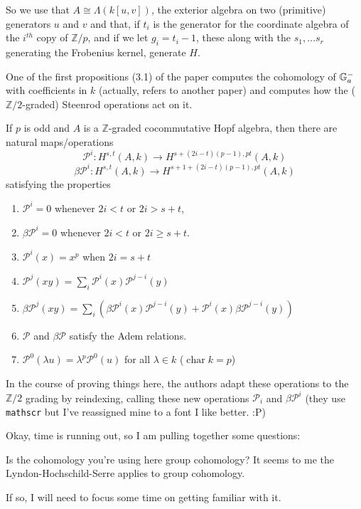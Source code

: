 \documentclass[12pt]{article}
\theoremstyle{nonumberbreak}
\theoremstyle{changebreak}
\theoremstyle{nonumberplain}
\theoremstyle{change}
\newcommand*{\bbZ}{\mathbb{Z}}
\newcommand*{\bbG}{\ensuremath\mathbb{G}}
\DeclareMathOperator{\ch}{char}
\begin{document}
So we use that $A\cong \Lambda(k[u,v])$, the exterior algebra on two (primitive) generators $u$ and $v$
and that, if $t_i$ is the generator for the coordinate algebra of the $i^{th}$ copy of $\bbZ/p$, and if 
we let $g_i=t_i-1$, these along with the $s_1,\dots s_r$ generating the Frobenius kernel, generate $H$.

One of the first propositions (3.1) of the paper computes the cohomology of $\bbG_a^-$ with 
coefficients in $k$ (actually, refers to another paper) and computes how the ($\bbZ/2$-graded)
Steenrod operations act on it. 

\begin{defn}
	If $p$ is odd and $A$ is a $\bbZ$-graded cocommutative Hopf algebra, then there are natural maps/operations
	\[\mathcal P^i:H^{s,t}(A,k)\to H^{s+(2i-t)(p-1),pt}(A,k)\]
	\[\beta \mathcal P^i:H^{s,t}(A,k)\to H^{s+1+(2i-t)(p-1),pt}(A,k)\]
	satisfying the properties
	\begin{enumerate}
		\item $\mathcal P^i=0$ whenever $2i<t$ or $2i>s+t$,
		\item $\beta\mathcal P^i=0$ whenever $2i<t$ or $2i\ge s+t$.
		\item $\mathcal P^i(x)=x^p$ when $2i=s+t$
		\item $\mathcal P^j(xy)=\sum_i\mathcal P^i(x)\mathcal P^{j-i}(y)$
		\item $\beta\mathcal P^j(xy)=\sum_i(\beta\mathcal P^i(x)\mathcal P^{j-i}(y)+\mathcal P^i(x)\beta\mathcal P^{j-i}(y))$
		\item $\mathcal P$ and $\beta\mathcal P$ satisfy the Adem relations.
		\item $\mathcal P^0(\lambda u)=\lambda^p\mathcal P^0(u)$ for all $\lambda \in k$ ($\ch k= p$)
	\end{enumerate}
\end{defn}

In the course of proving things here, the authors adapt these operations to the $\bbZ/2$ grading
by reindexing, calling these new operations $\mathscr P_i$ and $\beta\mathscr P^i$ (they use \texttt{mathscr} but I've
reassigned mine to a font I like better. :P)

Okay, time is running out, so I am pulling together some questions:
\begin{qst}
	Is the cohomology you're using here group cohomology? It seems to me the Lyndon-Hochschild-Serre
	applies to group cohomology.

	If so, I will need to focus some time on getting familiar with it.
\end{qst}
\end{document}
